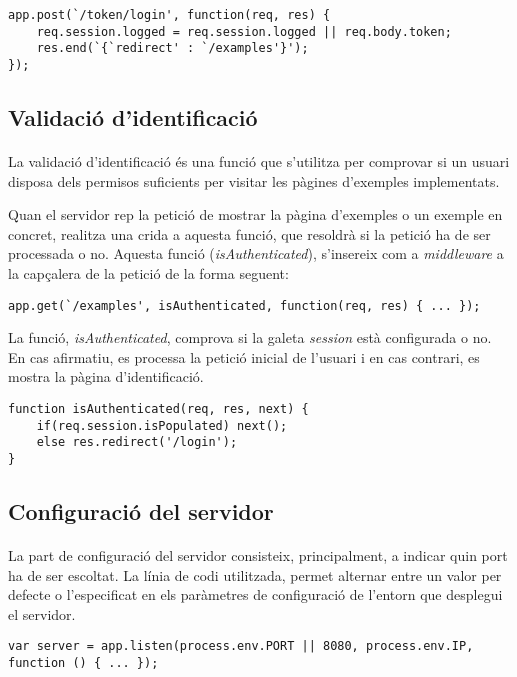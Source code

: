    \begin{lstlisting}[style=rawOwn,caption={Resposta a la petició AJAX d'identificació}]
app.post(`/token/login', function(req, res) {
    req.session.logged = req.session.logged || req.body.token;
    res.end(`{`redirect' : `/examples'}');
});
    \end{lstlisting}


    \subsection{Validació d'identificació}

    \paragraph{}
    La validació d'identificació és una funció que s'utilitza per comprovar si un usuari disposa dels permisos suficients per visitar les pàgines d'exemples implementats.

    Quan el servidor rep la petició de mostrar la pàgina d'exemples o un exemple en concret, realitza una crida a aquesta funció, que resoldrà si la petició ha de ser processada o no. Aquesta funció (\emph{isAuthenticated}), s'insereix com a \emph{middleware} a la capçalera de la petició de la forma seguent:

    \begin{lstlisting}[style=rawOwn,caption={Inserció de \emph{middleware} en una petició del client}]
app.get(`/examples', isAuthenticated, function(req, res) { ... });
    \end{lstlisting}

    La funció, \emph{isAuthenticated}, comprova si la galeta \emph{session} està configurada o no. En cas afirmatiu, es processa la petició inicial de l'usuari i en cas contrari, es mostra la pàgina d'identificació.

    \begin{lstlisting}[style=rawOwn,caption={Comprovació de la galeta \emph{session}}]
function isAuthenticated(req, res, next) {
    if(req.session.isPopulated) next();
    else res.redirect('/login');
}
    \end{lstlisting}


    \subsection{Configuració del servidor}

    \paragraph{}
    La part de configuració del servidor consisteix, principalment, a indicar quin port ha de ser escoltat. La línia de codi utilitzada, permet alternar entre un valor per defecte o l'especificat en els paràmetres de configuració de l'entorn que desplegui el servidor.

    \begin{lstlisting}[style=rawOwn,caption={Configuració del servidor}]
var server = app.listen(process.env.PORT || 8080, process.env.IP, function () { ... });
    \end{lstlisting}
